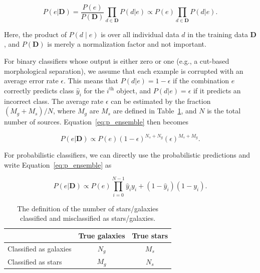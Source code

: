 \documentclass[useAMS,usenatbib]{mn2e}
\newcommand{\eg}{{e.g., }}
\begin{document}
\begin{equation}
  P \left(e | \mathbf{D} \right)
  = \frac{P \left(e \right)}{P \left(\mathbf{D} \right)}
  \prod_{d \in \mathbf{D}} P \left( d | e \right)
  \propto P \left(e\right) \prod_{d \in \mathbf{D}} P \left(d | e \right).
  \label{eq:p_ensemble}
\end{equation}

\noindent
Here, the product of $P\left(d \mid e\right)$ is
over all individual data $d$ in the training data $\mathbf{D}$,
and $P\left(\mathbf{D}\right)$ is merely a normalization factor
and not important.

For binary classifiers whose output is either zero or one
(\eg a cut-based morphological separation),
we assume that each example is corrupted with
an average error rate $\epsilon$.
This means that
$P\left(d|e\right) = 1-\epsilon$ if the combination $e$
correctly predicts class $\hat{y}_i$ for the $i^{\text{th}}$ object,
and $P\left(d|e\right) = \epsilon$ if it predicts an incorrect class.
The average rate $\epsilon$ can be estimated by
the fraction $\left(M_g + M_s\right) / N$,
where $M_g$ are $M_s$ are defined in Table~\ref{table:def_numbers},
and $N$ is the total number of sources.
Equation~\ref{eq:p_ensemble} then becomes

\begin{equation}
  P \left( e | \mathbf{D} \right) \propto 
  P \left( e \right) \left(1 - \epsilon \right)^{N_s + N_g}
  \left( \epsilon \right)^{M_s + M_g}.
\end{equation}

\noindent
For probabilistic classifiers,
we can directly use the probabilistic predictions
and write Equation~\ref{eq:p_ensemble} as

\begin{equation}
  P \left( e | \mathbf{D} \right) \propto 
  P \left( e \right) \prod_{i=0}^{N-1}
  \hat{y}_i y_i + 
  \left(1 - \hat{y}_i\right) \left(1 - y_i\right).
\end{equation}


\begin{table}
  \caption{The definition of the number of stars/galaxies
           classified and misclassified as stars/galaxies.}
  \centering
  \begin{tabular}{ l | c | c }
    \hline
                           & True galaxies & True stars \\ \hline
    Classified as galaxies & $N_g$ & $M_s$ \\ \hline
    Classified as stars & $M_g$ & $N_s$ \\
    \hline
  \end{tabular}
  \label{table:def_numbers}
\end{table}
\end{document}
